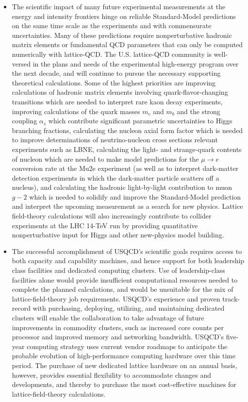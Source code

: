 \begin{itemize}

\item The scientific impact of many future experimental measurements at the energy and intensity frontiers hinge on reliable Standard-Model predictions on the same time
scale as the experiments and with commensurate uncertainties. Many of these predictions require nonperturbative hadronic matrix elements or fundamental QCD parameters that can only be computed numerically with lattice-QCD. The U.S. lattice-QCD community is well-versed in the plans and needs of the experimental high-energy program
over the next decade, and will continue to pursue the necessary supporting theoretical calculations.   Some of the highest priorities are improving calculations of hadronic matrix elements involving quark-flavor-changing transitions which are needed to interpret rare kaon decay experiments, improving calculations of the quark masses $m_c$ and $m_b$ and the strong coupling $\alpha_s$ which contribute significant parametric uncertainties to Higgs branching fractions, calculating the nucleon axial form factor which is needed to improve determinations of neutrino-nucleon cross sections relevant experiments such as LBNE, calculating the light- and strange-quark contents of nucleon which are needed to make model predictions for the $\mu \to e$ conversion rate at the Mu2e experiment (as well as to interpret dark-matter detection experiments in which
the dark-matter particle scatters off a nucleus), and calculating the hadronic light-by-light contribution to muon $g-2$ which is needed to solidify and improve the Standard-Model prediction and interpret the upcoming measurement as a search for new physics.  Lattice field-theory calculations will also increasingly contribute to collider experiments at the LHC 14-TeV run by providing quantitative nonperturbative input for Higgs and other new-physics model building.

\item The successful accomplishment of USQCD's scientific goals requires access to both capacity and capability machines, and hence support for both leadership class facilities and dedicated computing clusters.  Use of leadership-class facilities alone would provide insufficient computational resources needed to complete the planned calculations, and would be unsuitable for the mix of lattice-field-theory job requirements.   USQCD's experience and proven track-record with purchasing, deploying, utilizing, and maintaining dedicated clusters will enable the collaboration to take advantage of future improvements in commodity clusters, such as increased core counts per processor and improved memory and networking bandwidth.   USQCD's five-year computing strategy uses current vendor roadmaps to anticipate the probable evolution of high-performance computing hardware over this time period.  The purchase of new dedicated lattice hardware on an annual basis, however, provides essential flexibility to accommodate changes and developments, and thereby to purchase the most cost-effective machines for lattice-field-theory calculations.


\end{itemize}
